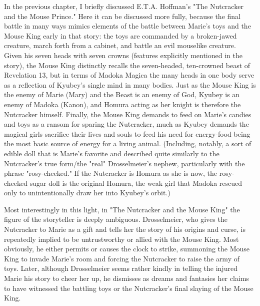 In the previous chapter, I briefly discussed E.T.A. Hoffman's "The Nutcracker and the Mouse Prince." Here it can be discussed more fully, because the final battle in many ways mimics elements of the battle between Marie's toys and the Mouse King early in that story: the toys are commanded by a broken-jawed creature, march forth from a cabinet, and battle an evil mouselike creature. Given his seven heads with seven crowns (features explicitly mentioned in the story), the Mouse King distinctly recalls the seven-headed, ten-crowned beast of Revelation 13, but in terms of Madoka Magica the many heads in one body serve as a reflection of Kyubey's single mind in many bodies. Just as the Mouse King is the enemy of Marie (Mary) and the Beast is an enemy of God, Kyubey is an enemy of Madoka (Kanon), and Homura acting as her knight is therefore the Nutcracker himself. Finally, the Mouse King demands to feed on Marie's candies and toys as a ransom for sparing the Nutcracker, much as Kyubey demands the magical girls sacrifice their lives and souls to feed his need for energy-food being the most basic source of energy for a living animal. (Including, notably, a sort of edible doll that is Marie's favorite and described quite similarly to the Nutcracker's true form/the "real" Drosselmeier's nephew, particularly with the phrase "rosy-cheeked." If the Nutcracker is Homura as she is now, the rosy-cheeked sugar doll is the original Homura, the weak girl that Madoka rescued only to unintentionally draw her into Kyubey's orbit.)

Most interestingly in this light, in "The Nutcracker and the Mouse King" the figure of the storyteller is deeply ambiguous. Drosselmeier, who gives the Nutcracker to Marie as a gift and tells her the story of his origins and curse, is repeatedly implied to be untrustworthy or allied with the Mouse King. Most obviously, he either permits or causes the clock to strike, summoning the Mouse King to invade Marie's room and forcing the Nutcracker to raise the army of toys. Later, although Drosselmeier seems rather kindly in telling the injured Marie his story to cheer her up, he dismisses as dreams and fantasies her claims to have witnessed the battling toys or the Nutcracker's final slaying of the Mouse King. 

